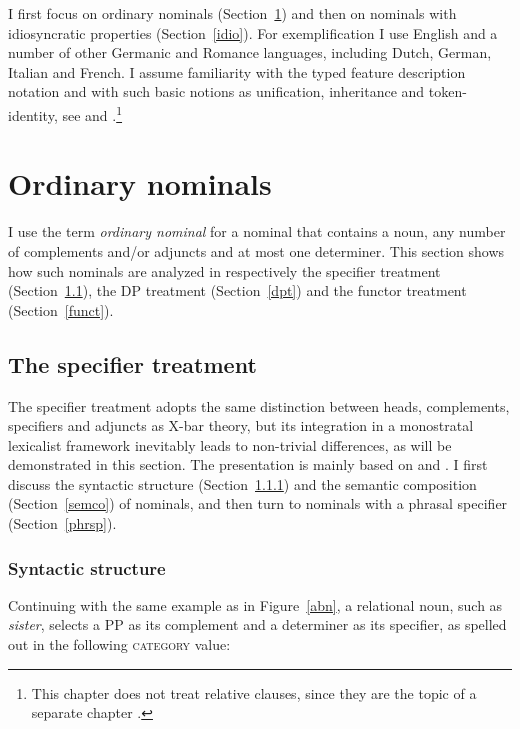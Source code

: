 \documentclass[output=paper
	        ,collection
	        ,collectionchapter
 	        ,biblatex
                ,babelshorthands
                ,newtxmath
                ,draftmode
                ,colorlinks, citecolor=brown
]{langscibook}
\begin{document}
I first focus on ordinary nominals (Section~\ref{ordi}) and then on nominals with idiosyncratic 
properties (Section~\ref{idio}). For exemplification I use English and a number of other Germanic 
and Romance languages, including Dutch, German, Italian and French.  
I assume familiarity with the typed feature description notation and with such basic notions 
as unification, inheritance and token-identity, see  
and .\footnote{This chapter does not treat relative clauses,
since they are the topic of a separate chapter .}
    
\section{Ordinary nominals} 
\label{ordi} 

I use the term \emph{ordinary nominal} for a nominal that contains a noun, 
any number of complements and/or adjuncts and at most one determiner. 
This section shows how such nominals are analyzed in respectively the 
specifier treatment (Section~\ref{spect}), the DP treatment (Section~\ref{dpt}) and 
the functor treatment (Section~\ref{funct}). 

    
\subsection{The specifier treatment} 
\label{spect} 


The specifier treatment adopts the same distinction between heads, complements, 
specifiers and adjuncts as X-bar theory, but its integration 
in a monostratal lexicalist framework inevitably leads to non-trivial differences,
as will be demonstrated in this section. 
The presentation is mainly based on \citet{ps2} and \citet{GS00}. 
I first discuss the syntactic structure (Section~\ref{syns}) and the semantic composition (Section~\ref{semco}) 
of nominals, and then turn to nominals with a phrasal specifier (Section~\ref{phrsp}). 


\subsubsection{Syntactic structure}
\label{syns} 

Continuing with the same example as in Figure~\ref{abn}, 
a relational noun, such as \emph{sister}, selects a PP as its complement 
and a determiner as its specifier, as spelled out in 
the following \textsc{category} value:  
\end{document}
